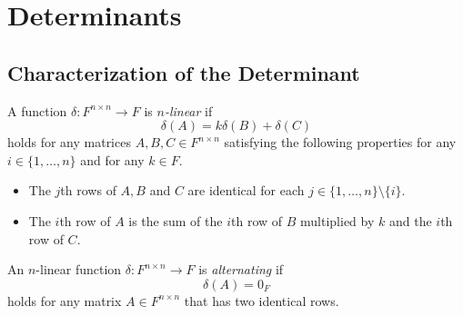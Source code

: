 \chapter{Determinants}
\section{Characterization of the Determinant}
\begin{definition}
  \label{def:multilinear}
  A function $\delta: F^{n \times n} \to F$ is \emph{$n$-linear} if
  \begin{equation*}
    \delta(A) = k\delta(B) + \delta(C)
  \end{equation*}
  holds for any matrices $A, B, C \in F^{n \times n}$ satisfying the following
  properties for any $i \in \{1, \dots, n\}$ and for any $k \in F$.
  \begin{itemize}
    \item The $j$th rows of $A, B$ and $C$ are identical for each
    $j \in \{1, \dots, n\} \setminus \{i\}$.
    \item The $i$th row of $A$ is the sum of the $i$th row of $B$ multiplied by
    $k$ and the $i$th row of $C$.
  \end{itemize}
\end{definition}

\begin{definition}
  An $n$-linear function $\delta: F^{n \times n} \to F$ is \emph{alternating}
  if
  \begin{equation*}
    \delta(A) = 0_F
  \end{equation*}
  holds for any matrix $A \in F^{n \times n}$ that has two identical rows.
\end{definition}

